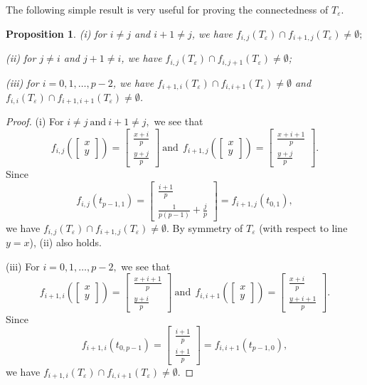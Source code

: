 \documentclass[12pt, reqno]{amsart}
\newtheorem{Prop}[theorem]{Proposition}
\numberwithin{equation}{section}
\begin{document}
The following simple result is very useful for proving the connectedness of $T_{\varepsilon}$.

\begin{Prop}\label{prop4}
(i) for $i\neq j$ and $i+1\neq j$, we have $f_{i,j}(T_{\varepsilon})\cap f_{i+1,j}(T_{\varepsilon})\neq\emptyset;$

(ii) for  $j\neq i$ and $j+1\neq i$, we have $f_{i,j}(T_{\varepsilon})\cap f_{i,j+1}(T_{\varepsilon})\neq\emptyset$;

(iii) for $i=0,1,\dots,p-2$, we have $f_{i+1,i}(T_{\varepsilon})\cap f_{i,i+1}(T_{\varepsilon})\neq\emptyset$ and  $f_{i,i}(T_{\varepsilon})\cap f_{i+1,i+1}(T_{\varepsilon})\neq\emptyset$.
\end{Prop}

\begin{proof}
(i) For $i\neq j\ \text{and}\ i+1\neq j,$ we see that
$$f_{i,j}\left(\left[\begin{array}{c}x\\y\end{array}\right]\right)=\left[\begin{array}{c}\frac{x+i}{p}\\\frac{y+j}{p}\end{array}\right]\ \text{and}\ \
f_{i+1,j}\left(\left[\begin{array}{c}x\\y\end{array}\right]\right)=\left[\begin{array}{c}\frac{x+i+1}{p}\\\frac{y+j}{p}\end{array}\right].$$
Since $$f_{i,j}(t_{p-1,1})=\left[\begin{array}{c}\frac{i+1}p\\\frac{1}{p(p-1)}+\frac{j}{p}\end{array}\right]=f_{i+1,j}(t_{0,1}),$$  we have $f_{i,j}(T_{\varepsilon})\cap f_{i+1,j}(T_{\varepsilon})\neq\emptyset$. By symmetry of $T_{\varepsilon}$ (with respect to line $y=x$), (ii) also holds.

(iii) For $i=0,1,\dots,p-2,$ we see that
$$f_{i+1,i}\left(\left[\begin{array}{c}x\\y\end{array}\right]\right)=\left[\begin{array}{c}\frac{x+i+1}p\\\frac{y+i}p\end{array}\right]\ \text{and}\ \
f_{i,i+1}\left(\left[\begin{array}{c}x\\y\end{array}\right]\right)=\left[\begin{array}{c}\frac{x+i}p\\\frac{y+i+1}p\end{array}\right].$$
Since $$f_{i+1,i}(t_{0,p-1})=\left[\begin{array}{c}\frac{i+1}p\\\frac{i+1}p\end{array}\right]=f_{i,i+1}(t_{p-1,0}),$$
 we have  $f_{i+1,i}(T_{\varepsilon})\cap f_{i,i+1}(T_{\varepsilon})\neq\emptyset$.


\end{proof}
\end{document}
